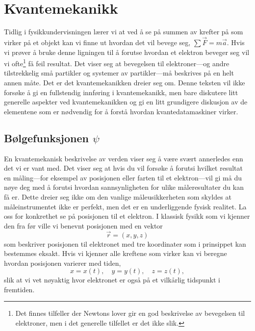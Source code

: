 \chapter{Kvantemekanikk}

Tidlig i fysikkundervisningen lærer vi at ved å se på summen av krefter på som virker på et objekt kan vi finne ut hvordan det vil bevege seg, $\sum\vec{F} = m\vec{a}$. Hvis vi prøver å bruke denne ligningen til å forutse hvordan et elektron beveger seg vil vi ofte\footnote{Det finnes tilfeller der Newtons lover gir en god beskrivelse av bevegelsen til elektroner, men i det generelle tilfellet er det ikke slik.} få feil resultat. Det viser seg at bevegelsen til elektroner---og andre tilstrekkelig små partikler og systemer av partikler---må beskrives på en helt annen måte. Det er det kvantemekanikken dreier seg om. Denne teksten vil ikke forsøke å gi en fullstendig innføring i kvantemekanikk, men bare diskutere litt generelle aspekter ved kvantemekanikken og gi en litt grundigere diskusjon av de elementene som er nødvendig for å forstå hvordan kvantedatamaskiner virker.

\section{Bølgefunksjonen $\psi$}
\label{sec:kvante:psi}
En kvantemekanisk beskrivelse av verden viser seg å være svært annerledes enn det vi er vant med. Det viser seg at hvis du vil forsøke å forutsi hvilket resultat en måling---for eksempel av posisjonen eller farten til et elektron---vil gi må du nøye deg med å forutsi hvordan sannsynligheten for ulike måleresultater du kan få er. Dette dreier seg ikke om den vanlige måleusikkerheten som skyldes at måleinstrumentet ikke er perfekt, men det er en underliggende fysisk realitet. La oss for konkrethet se på posisjonen til et elektron. I klassisk fysikk som vi kjenner den fra før ville vi benevnt posisjonen med en vektor
\begin{displaymath}
	\vec{r} = (x,y,z)
\end{displaymath}
som beskriver posisjonen til elektronet med tre koordinater som i prinsippet kan bestemmes eksakt. Hvis vi kjenner alle kreftene som virker kan vi beregne hvordan posisjonen varierer med tiden,
\begin{displaymath}
	x = x(t),\quad y = y(t),\quad z=z(t),
\end{displaymath}
slik at vi vet nøyaktig hvor elektronet er også på et vilkårlig tidspunkt i fremtiden.

